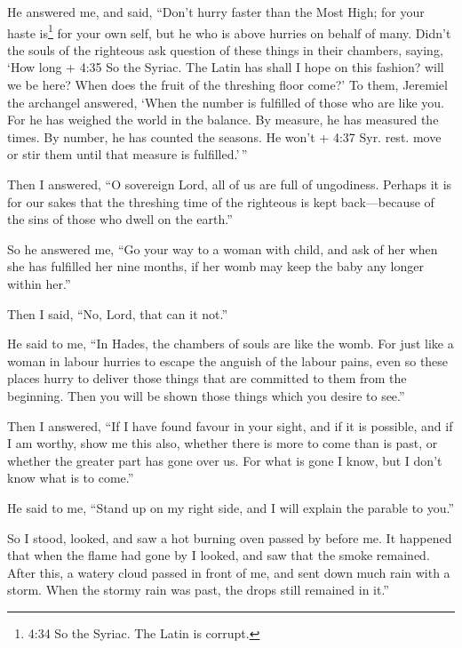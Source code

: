  He answered me, and said, ``Don't hurry faster than the
Most High; for your haste is\footnote{4:34 So the Syriac. The Latin is
  corrupt.} for your own self, but he who is above hurries on behalf of
many.  Didn't the souls of the righteous ask question of
these things in their chambers, saying, `How long + 4:35 So the Syriac.
The Latin has shall I hope on this fashion? will we be here? When does
the fruit of the threshing floor come?'  To them, Jeremiel
the archangel answered, `When the number is fulfilled of those who are
like you. For he has weighed the world in the balance.  By
measure, he has measured the times. By number, he has counted the
seasons. He won't + 4:37 Syr. rest. move or stir them until that measure
is fulfilled.'\,''

 Then I answered, ``O sovereign Lord, all of us are full of
ungodiness.  Perhaps it is for our sakes that the threshing
time of the righteous is kept back---because of the sins of those who
dwell on the earth.''

 So he answered me, ``Go your way to a woman with child,
and ask of her when she has fulfilled her nine months, if her womb may
keep the baby any longer within her.''

 Then I said, ``No, Lord, that can it not.''

He said to me, ``In Hades, the chambers of souls are like the womb.
 For just like a woman in labour hurries to escape the
anguish of the labour pains, even so these places hurry to deliver those
things that are committed to them from the beginning.  Then
you will be shown those things which you desire to see.''

 Then I answered, ``If I have found favour in your sight,
and if it is possible, and if I am worthy,  show me this
also, whether there is more to come than is past, or whether the greater
part has gone over us.  For what is gone I know, but I
don't know what is to come.''

 He said to me, ``Stand up on my right side, and I will
explain the parable to you.''

 So I stood, looked, and saw a hot burning oven passed by
before me. It happened that when the flame had gone by I looked, and saw
that the smoke remained.  After this, a watery cloud passed
in front of me, and sent down much rain with a storm. When the stormy
rain was past, the drops still remained in it.''

